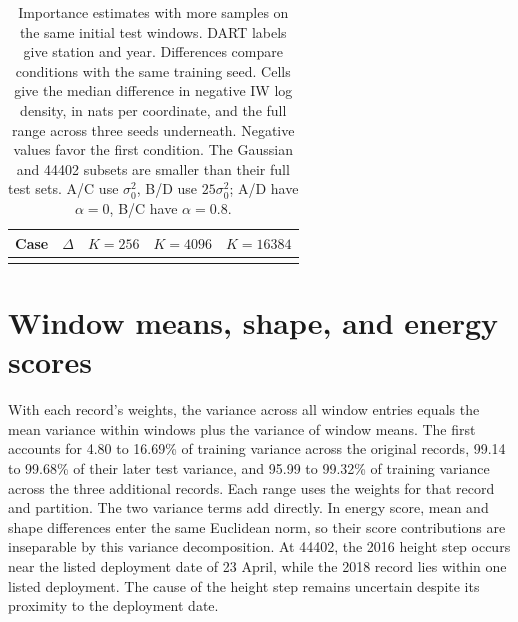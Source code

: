 \documentclass{article}
\begin{document}
\begin{table}[H]
\centering
\setlength{\tabcolsep}{1.4pt}
\caption{Importance estimates with more samples on the same initial test windows. DART labels give station and year. Differences compare conditions with the same training seed. Cells give the median difference in negative IW log density, in nats per coordinate, and the full range across three seeds underneath. Negative values favor the first condition. The Gaussian and 44402 subsets are smaller than their full test sets. A/C use $\sigma_0^2$, B/D use $25\sigma_0^2$; A/D have $\alpha=0$, B/C have $\alpha=0.8$.}
\label{tab:refinement}
\begin{tabular}{llccc}
\toprule
Case & $\Delta$ & $K=256$ & $K=4096$ & $K=16384$\\
\midrule
\\
\bottomrule
\end{tabular}
\end{table}

\section{Window means, shape, and energy scores}
With each record's weights, the variance across all window entries equals the mean variance within windows plus the variance of window means. The first accounts for 4.80 to 16.69\% of training variance across the original records, 99.14 to 99.68\% of their later test variance, and 95.99 to 99.32\% of training variance across the three additional records. Each range uses the weights for that record and partition. The two variance terms add directly. In energy score, mean and shape differences enter the same Euclidean norm, so their score contributions are inseparable by this variance decomposition. At 44402, the 2016 height step occurs near the listed deployment date of 23 April, while the 2018 record lies within one listed deployment. The cause of the height step remains uncertain despite its proximity to the deployment date.
\end{document}
